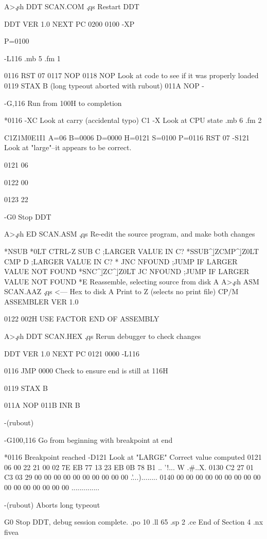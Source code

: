 A>\c
.sh
DDT SCAN.COM    \c
.qs
Restart DDT

DDT VER 1.0
NEXT PC
0200 0100
-XP

P=0100

-L116
.mb 5
.fm 1

 0116   RST        07
 0117   NOP
 0118   NOP               Look at code to see if it was properly loaded
 0119   STAX       B      (long typeout aborted with rubout)
 011A   NOP
 -

-G,116    Run from 100H to completion

*0116
-XC     Look at carry (accidental typo)
C1
-X   Look at CPU state
.mb 6
.fm 2

C1Z1M0E1I1 A=06 B=0006 D=0000 H=0121 S=0100 P=0116 RST 07
-S121   Look at "large"--it appears to be correct.

0121 06

0122 00

0123 22

-G0    Stop DDT

A>\c
.sh
ED SCAN.ASM    \c
.qs
Re-edit the source program, and make both changes

*NSUB
*0LT
     CTRL-Z        SUB     C           ;LARGER VALUE IN C?
*SSUB^\b|ZCMP^\b|Z0LT
                   CMP     D           ;LARGER VALUE IN C?
*
                   JNC     NFOUND      ;JUMP IF LARGER VALUE NOT FOUND
*SNC^\b|ZC^\b|Z0LT
                   JC      NFOUND      ;JUMP IF LARGER VALUE NOT FOUND
*E
                      Reassemble, selecting source from disk A
A>\c
.sh
ASM SCAN.AAZ   \c
.qs
<--- Hex to disk A
                      Print to Z (selects no print file)
CP/M ASSEMBLER    VER 1.0

0122
002H USE FACTOR
END OF ASSEMBLY

A>\c
.sh
DDT SCAN.HEX    \c
.qs
Rerun debugger to check changes

DDT VER 1.0
NEXT PC
0121 0000
-L116

 0116   JMP        0000     Check to ensure end is still at 116H
 
 0119   STAX       B

 011A   NOP    
 011B   INR        B

 -(rubout)

-G100,116    Go from beginning with breakpoint at end

*0116    Breakpoint reached
-D121    Look at "LARGE"
                      Correct value computed
0121 06 00 22 21 00 02 7E EB 77 13 23 EB 0B 78 B1 .. '!... W .#..X.
0130 C2 27 01 C3 03 29 00 00 00 00 00 00 00 00 00 00 .'...)........
0140 00 00 00 00 00 00 00 00 00 00 00 00 00 00 00 00 ..............

-(rubout) Aborts long typeout

G0    Stop DDT, debug session complete.
.po 10
.ll 65
.sp 2
.ce
End of Section 4
.nx fivea
